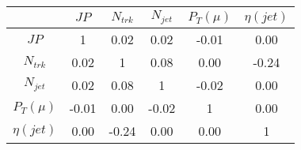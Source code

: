 \begin{tabular}{|c|c|c|c|c|c|} 
\hline
 & $JP$ & $N_{trk}$ & $N_{jet}$ & $P_{T} (\mu)$ & $\eta (jet)$ \\ \hline
$JP$ & 1 & 0.02 & 0.02 & -0.01 & 0.00 \\
$N_{trk}$ & 0.02 & 1 & 0.08 & 0.00 & -0.24 \\
$N_{jet}$ & 0.02 & 0.08 & 1 & -0.02 & 0.00 \\
$P_{T} (\mu)$ & -0.01 & 0.00 & -0.02 & 1 & 0.00 \\
$\eta (jet)$ & 0.00 & -0.24 & 0.00 & 0.00 & 1 \\
\hline 
\end{tabular} 


